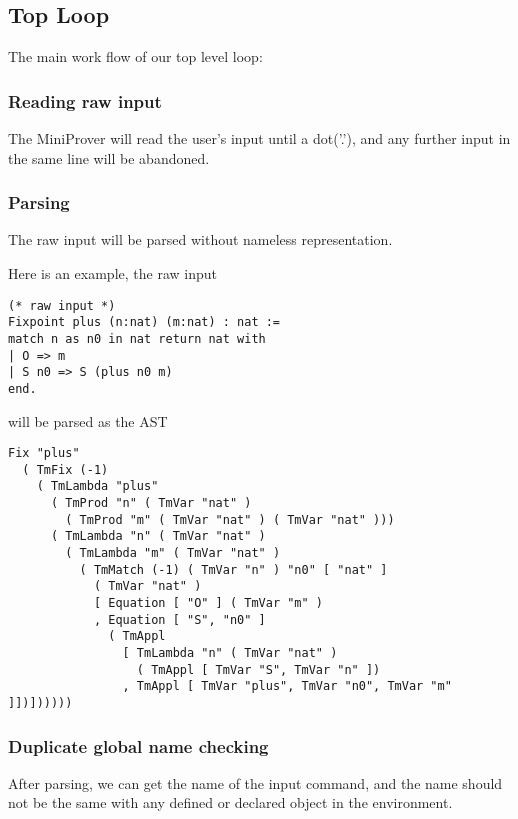 \subsection{Top Loop}
The main work flow of our top level loop:
\subsubsection*{Reading raw input}
The MiniProver will read the user's input until a dot('.'), and any further input in the same line will be abandoned.
\subsubsection*{Parsing}
The raw input will be parsed without nameless representation.

Here is an example, the raw input
\begin{center}
\begin{minipage}{0.6\textwidth}
\begin{verbatim}
(* raw input *)
Fixpoint plus (n:nat) (m:nat) : nat :=
match n as n0 in nat return nat with
| O => m
| S n0 => S (plus n0 m)
end.
\end{verbatim}
\end{minipage}
\end{center}
will be parsed as the AST
\begin{center}
\begin{minipage}{0.9\textwidth}
\begin{verbatim}
Fix "plus"
  ( TmFix (-1)
    ( TmLambda "plus"
      ( TmProd "n" ( TmVar "nat" )
        ( TmProd "m" ( TmVar "nat" ) ( TmVar "nat" )))
      ( TmLambda "n" ( TmVar "nat" )
        ( TmLambda "m" ( TmVar "nat" )
          ( TmMatch (-1) ( TmVar "n" ) "n0" [ "nat" ]
            ( TmVar "nat" )
            [ Equation [ "O" ] ( TmVar "m" )
            , Equation [ "S", "n0" ]
              ( TmAppl
                [ TmLambda "n" ( TmVar "nat" )
                  ( TmAppl [ TmVar "S", TmVar "n" ])
                , TmAppl [ TmVar "plus", TmVar "n0", TmVar "m" ]])])))))
\end{verbatim}
\end{minipage}
\end{center}
\subsubsection*{Duplicate global name checking}
After parsing, we can get the name of the input command, and the name should not be the same with
any defined or declared object in the environment.
